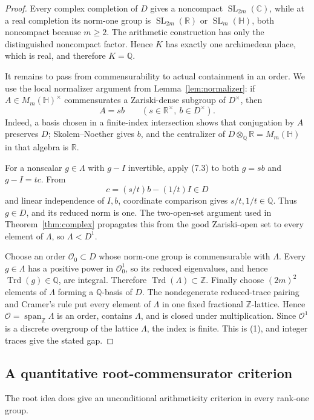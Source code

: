 \documentclass[11pt,reqno]{amsart}
\theoremstyle{definition}
\theoremstyle{remark}
\newcommand{\R}{\mathbb R}
\newcommand{\C}{\mathbb C}
\newcommand{\Q}{\mathbb Q}
\newcommand{\Z}{\mathbb Z}
\newcommand{\cO}{\mathcal O}
\newcommand{\Trd}{\operatorname{Trd}}
\newcommand{\Span}{\operatorname{span}}
\newcommand{\SL}{\operatorname{SL}}
\begin{document}
\begin{proof}
Every complex completion of
\(D\) gives a noncompact \(\SL_{2m}(\C)\), while at a real completion its
norm-one group is \(\SL_{2m}(\R)\) or \(\SL_m(\mathbb H)\), both noncompact
because \(m\ge2\).  The arithmetic construction has only the distinguished
noncompact factor.  Hence \(K\) has exactly one archimedean place, which is
real, and therefore \(K=\Q\).

It remains to pass from commensurability to actual containment in an order.
We use the local normalizer argument from Lemma~\ref{lem:normalizer}: if
\(A\in M_m(\mathbb H)^\times\) commensurates a Zariski-dense subgroup of
\(D^\times\), then
\[
 A=s b\qquad(s\in\R^\times,\ b\in D^\times).
\tag{7.3}
\]
Indeed, a basis chosen in a finite-index intersection shows that conjugation
by \(A\) preserves \(D\); Skolem--Noether
\cite[Section~12.6]{Pierce} gives \(b\), and the centralizer
of \(D\otimes_\Q\R=M_m(\mathbb H)\) in that algebra is \(\R\).

For a nonscalar \(g\in\Lambda\) with \(g-I\) invertible, apply (7.3) to both
\(g=s b\) and \(g-I=t c\).  From
\[
 c=(s/t)b-(1/t)I\in D
\]
and linear independence of \(I,b\), coordinate comparison gives
\(s/t,1/t\in\Q\).  Thus \(g\in D\), and its reduced norm is one.  The
two-open-set argument used in Theorem~\ref{thm:complex} propagates this from
the good Zariski-open set to every element of \(\Lambda\), so
\(\Lambda<D^1\).

Choose an order \(\cO_0\subset D\) whose norm-one group is commensurable with
\(\Lambda\).  Every \(g\in\Lambda\) has a positive power in \(\cO_0^1\), so
its reduced eigenvalues, and hence \(\Trd(g)\in\Q\), are integral.  Therefore
\(\Trd(\Lambda)\subset\Z\).  Finally choose \((2m)^2\) elements of \(\Lambda\)
forming a \(\Q\)-basis of \(D\).  The nondegenerate reduced-trace pairing and
Cramer's rule put every element of \(\Lambda\) in one fixed fractional
\(\Z\)-lattice.  Hence \(\cO=\Span_\Z\Lambda\) is an order, contains
\(\Lambda\), and is closed under multiplication.  Since \(\cO^1\) is a
discrete overgroup of the lattice \(\Lambda\), the index is finite.  This is
(1), and integer traces give the stated gap.
\end{proof}

\subsection{A quantitative root-commensurator criterion}

The root idea does give an unconditional arithmeticity criterion in every
rank-one group.
\end{document}
